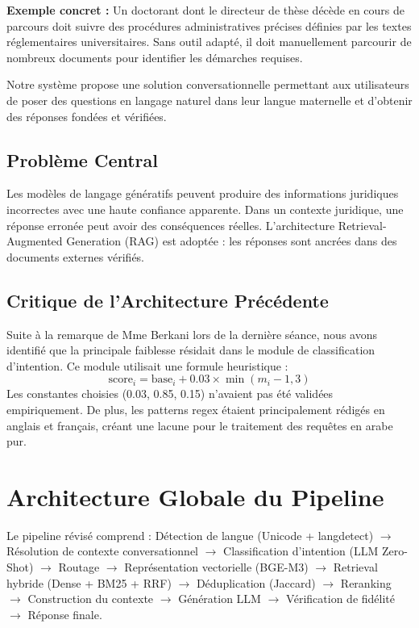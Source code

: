 \documentclass[11pt,a4paper]{article}
\begin{document}
\textbf{Exemple concret :} Un doctorant dont le directeur de thèse décède en cours de parcours doit suivre des procédures administratives précises définies par les textes réglementaires universitaires. Sans outil adapté, il doit manuellement parcourir de nombreux documents pour identifier les démarches requises.

Notre système propose une solution conversationnelle permettant aux utilisateurs de poser des questions en langage naturel dans leur langue maternelle et d'obtenir des réponses fondées et vérifiées.

\subsection{Problème Central}

Les modèles de langage génératifs peuvent produire des informations juridiques incorrectes avec une haute confiance apparente. Dans un contexte juridique, une réponse erronée peut avoir des conséquences réelles. L'architecture Retrieval-Augmented Generation (RAG) est adoptée : les réponses sont ancrées dans des documents externes vérifiés.

\subsection{Critique de l'Architecture Précédente}

Suite à la remarque de Mme Berkani lors de la dernière séance, nous avons identifié que la principale faiblesse résidait dans le module de classification d'intention. Ce module utilisait une formule heuristique :
\begin{equation}
\text{score}_i = \text{base}_i + 0.03 \times \min(m_i - 1, 3)
\end{equation}
Les constantes choisies (0.03, 0.85, 0.15) n'avaient pas été validées empiriquement. De plus, les patterns regex étaient principalement rédigés en anglais et français, créant une lacune pour le traitement des requêtes en arabe pur.

\section{Architecture Globale du Pipeline}

Le pipeline révisé comprend : Détection de langue (Unicode + langdetect) $\to$ Résolution de contexte conversationnel $\to$ Classification d'intention (LLM Zero-Shot) $\to$ Routage $\to$ Représentation vectorielle (BGE-M3) $\to$ Retrieval hybride (Dense + BM25 + RRF) $\to$ Déduplication (Jaccard) $\to$ Reranking $\to$ Construction du contexte $\to$ Génération LLM $\to$ Vérification de fidélité $\to$ Réponse finale.
\end{document}
